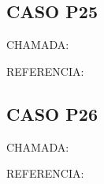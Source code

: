 \documentclass{undftex}
\begin{document}
\begin{refsection}\section*{CASO P25}\noindent CHAMADA: \par\noindent REFERENCIA:\par\printbibliography[heading=none]\end{refsection}\clearpage
\begin{refsection}\section*{CASO P26}\noindent CHAMADA: \par\noindent REFERENCIA:\par\printbibliography[heading=none]\end{refsection}\clearpage
\end{document}
